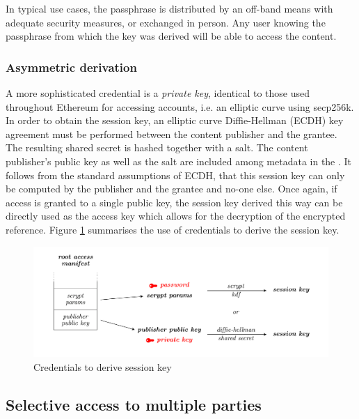 In typical use cases, the passphrase is distributed by an off-band means with adequate security measures, or exchanged in person. Any user knowing the passphrase from which the key was derived will be able to access the content.

\subsubsection{Asymmetric derivation}

A more sophisticated credential is a \emph{private key}, identical to those used throughout Ethereum for accessing accounts, i.e. an  elliptic curve using secp256k. In order to obtain the session key, an elliptic curve Diffie-Hellman (ECDH) key agreement must be performed between the content publisher and the grantee. The resulting shared secret is hashed together with a salt. The content publisher's public key as well as the salt are included among metadata in the . It follows from the standard assumptions of ECDH, that this session key can only be computed by the publisher and the grantee and no-one else. 
Once again, if access is granted to a single public key, the session key derived this way can be directly used as the access key which allows for the decryption of the encrypted reference. 
Figure \ref{fig:credentials-to-derive-session-key} summarises the use of credentials to derive the session key.

\begin{figure}[htbp]
\centering
\includegraphics[width=\textwidth]{fig/credentials-to-derive-session-key.pdf}
\caption[Credentials to derive session key  \statusyellow]{Credentials to derive session key}
\label{fig:credentials-to-derive-session-key}
\end{figure}


\subsection{Selective access to multiple parties\statusgreen}

